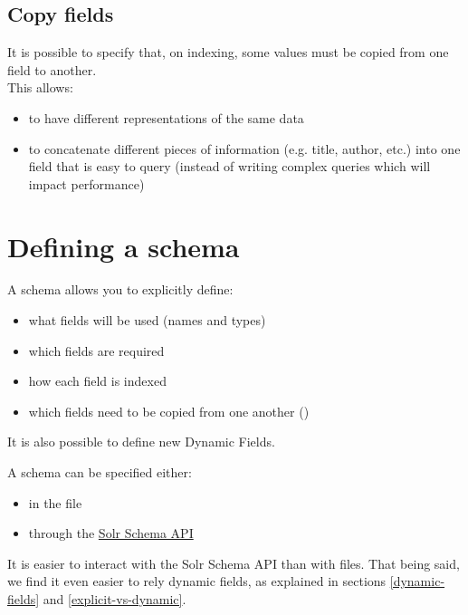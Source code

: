 \bigskip

\subsection{Copy fields} \label{copy-fields}

It is possible to specify that, on indexing, some values must be copied from one field to another. \\

This allows:
\begin{itemize}
	\item to have different representations of the same data
	\item to concatenate different pieces of information (e.g. title, author, etc.) into one field that is easy to query (instead of writing complex queries which will impact performance)
\end{itemize}

\bigskip


\newpage

\section{Defining a schema}

A schema allows you to explicitly define:

\begin{itemize}
	\item what fields will be used (names and types)
	\item which fields are required
	\item how each field is indexed
	\item which fields need to be copied from one another ()
\end{itemize}

It is also possible to define new Dynamic Fields.

\bigskip


A schema can be specified either:
\begin{itemize}
	\item in the  file
	\item through the \href{https://solr.apache.org/guide/solr/latest/indexing-guide/schema-api.html}{Solr Schema API}
\end{itemize}

\bigskip

It is easier to interact with the Solr Schema API than with files. That being said, we find it even easier to rely dynamic fields, as explained in sections \ref{dynamic-fields} and \ref{explicit-vs-dynamic}.

